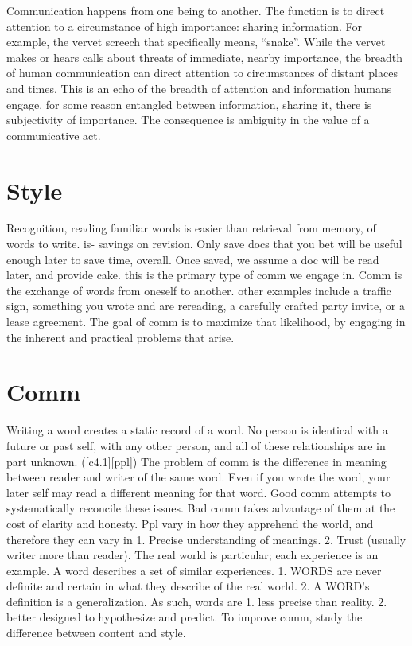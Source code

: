 \documentclass[
]{book}
\begin{document}
Communication happens from one being to another.
The function is to direct attention to a circumstance of high importance: sharing information.
For example, the vervet screech that specifically means, ``snake''.
While the vervet makes or hears calls about threats of immediate, nearby importance, the breadth of human communication can direct attention to circumstances of distant places and times.
This is an echo of the breadth of attention and information humans engage. for some reason entangled between information, sharing it, there is subjectivity of importance.
The consequence is ambiguity in the value of a communicative act.

\hypertarget{style}{%
\section{Style}\label{style}}

Recognition, reading familiar words is easier than retrieval from memory, of words to write. is- savings on revision.
Only save docs that you bet will be useful enough later to save time, overall.
Once saved, we assume a doc will be read later, and provide cake. this is the primary type of comm we engage in.
Comm is the exchange of words from oneself to another. other examples include a traffic sign, something you wrote and are rereading, a carefully crafted party invite, or a lease agreement.
The goal of comm is to maximize that likelihood, by engaging in the inherent and practical problems that arise.

\hypertarget{comm-comm}{%
\section{Comm}\label{comm-comm}}

Writing a word creates a static record of a word.
No person is identical with a future or past self, with any other person, and all of these relationships are in part unknown. ({[}c4.1{]}{[}ppl{]})
The problem of comm is the difference in meaning between reader and writer of the same word.
Even if you wrote the word, your later self may read a different meaning for that word.
Good comm attempts to systematically reconcile these issues.
Bad comm takes advantage of them at the cost of clarity and honesty.
Ppl vary in how they apprehend the world, and therefore they can vary in
1. Precise understanding of meanings.
2. Trust (usually writer more than reader).
The real world is particular; each experience is an example.
A word describes a set of similar experiences.
1. WORDS are never definite and certain in what they describe of the real world.
2. A WORD's definition is a generalization.
As such, words are
1. less precise than reality.
2. better designed to hypothesize and predict.
To improve comm, study the difference between content and style.
\end{document}
